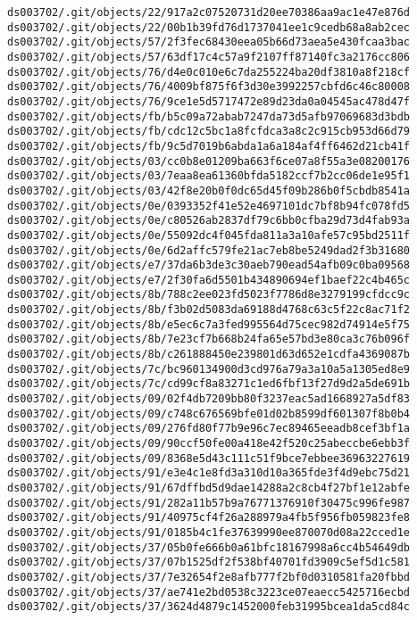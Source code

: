 \documentclass[11pt]{article}
\begin{document}
\begin{Verbatim}[commandchars=\\\{\}]
ds003702/.git/objects/22/917a2c07520731d20ee70386aa9ac1e47e876d
ds003702/.git/objects/22/00b1b39fd76d1737041ee1c9cedb68a8ab2cec
ds003702/.git/objects/57/2f3fec68430eea05b66d73aea5e430fcaa3bac
ds003702/.git/objects/57/63df17c4c57a9f2107ff87140fc3a2176cc806
ds003702/.git/objects/76/d4e0c010e6c7da255224ba20df3810a8f218cf
ds003702/.git/objects/76/4009bf875f6f3d30e3992257cbfd6c46c80008
ds003702/.git/objects/76/9ce1e5d5717472e89d23da0a04545ac478d47f
ds003702/.git/objects/fb/b5c09a72abab7247da73d5afb97069683d3bdb
ds003702/.git/objects/fb/cdc12c5bc1a8fcfdca3a8c2c915cb953d66d79
ds003702/.git/objects/fb/9c5d7019b6abda1a6a184af4ff6462d21cb41f
ds003702/.git/objects/03/cc0b8e01209ba663f6ce07a8f55a3e08200176
ds003702/.git/objects/03/7eaa8ea61360bfda5182ccf7b2cc06de1e95f1
ds003702/.git/objects/03/42f8e20b0f0dc65d45f09b286b0f5cbdb8541a
ds003702/.git/objects/0e/0393352f41e52e4697101dc7bf8b94fc078fd5
ds003702/.git/objects/0e/c80526ab2837df79c6bb0cfba29d73d4fab93a
ds003702/.git/objects/0e/55092dc4f045fda811a3a10afe57c95bd2511f
ds003702/.git/objects/0e/6d2affc579fe21ac7eb8be5249dad2f3b31680
ds003702/.git/objects/e7/37da6b3de3c30aeb790ead54afb09c0ba09568
ds003702/.git/objects/e7/2f30fa6d5501b434890694ef1baef22c4b465c
ds003702/.git/objects/8b/788c2ee023fd5023f7786d8e3279199cfdcc9c
ds003702/.git/objects/8b/f3b02d5083da69188d4768c63c5f22c8ac71f2
ds003702/.git/objects/8b/e5ec6c7a3fed995564d75cec982d74914e5f75
ds003702/.git/objects/8b/7e23cf7b668b24fa65e57bd3e80ca3c76b096f
ds003702/.git/objects/8b/c261888450e239801d63d652e1cdfa4369087b
ds003702/.git/objects/7c/bc960134900d3cd976a79a3a10a5a1305ed8e9
ds003702/.git/objects/7c/cd99cf8a83271c1ed6fbf13f27d9d2a5de691b
ds003702/.git/objects/09/02f4db7209bb80f3237eac5ad1668927a5df83
ds003702/.git/objects/09/c748c676569bfe01d02b8599df601307f8b0b4
ds003702/.git/objects/09/276fd80f77b9e96c7ec89465eeadb8cef3bf1a
ds003702/.git/objects/09/90ccf50fe00a418e42f520c25abeccbe6ebb3f
ds003702/.git/objects/09/8368e5d43c111c51f9bce7ebbee36963227619
ds003702/.git/objects/91/e3e4c1e8fd3a310d10a365fde3f4d9ebc75d21
ds003702/.git/objects/91/67dffbd5d9dae14288a2c8cb4f27bf1e12abfe
ds003702/.git/objects/91/282a11b57b9a76771376910f30475c996fe987
ds003702/.git/objects/91/40975cf4f26a288979a4fb5f956fb059823fe8
ds003702/.git/objects/91/0185b4c1fe37639990ee870070d08a22cced1e
ds003702/.git/objects/37/05b0fe666b0a61bfc18167998a6cc4b54649db
ds003702/.git/objects/37/07b1525df2f538bf40701fd3909c5ef5d1c581
ds003702/.git/objects/37/7e32654f2e8afb777f2bf0d0310581fa20fbbd
ds003702/.git/objects/37/ae741e2bd0538c3223ce07eaecc5425716ecbd
ds003702/.git/objects/37/3624d4879c1452000feb31995bcea1da5cd84c

\end{Verbatim}
\end{document}
